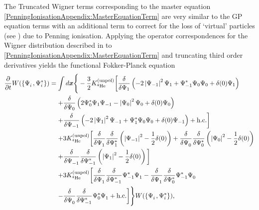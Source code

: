 The Truncated Wigner terms corresponding to the master equation \eqref{PenningIonisationAppendix:MasterEquationTerm} are very similar to the GP equation terms with an additional term to correct for the loss of `virtual' particles (see ) due to Penning ionisation.  Applying the operator correspondences for the Wigner distribution described in  to \eqref{PenningIonisationAppendix:MasterEquationTerm} and truncating third order derivatives yields the functional Fokker-Planck equation
\begin{align}
    \begin{split}
    \frac{\partial}{\partial t} W(\left\{ \Psi_i^{\phantom{*}}, \Psi_i^*\right\}) &= \int d \vect{x} \Bigg\{ -\frac{3}{2}\Kunpol\bigg[\frac{\delta}{\delta \Psi_1}\left(-2 \abs{\Psi_{-1}}^2\Psi_1 +\Psi_{-1}^*\Psi_0\Psi_0  + \delta(0) \Psi_1\right)\\
    &\relphantom{=} +\frac{\delta}{\delta \Psi_0}\left(2 \Psi_0^* \Psi_1 \Psi_{-1}  - \abs{\Psi_0}^2 \Psi_0 + \delta(0) \Psi_0\right)\\
    &\relphantom{=} +\frac{\delta}{\delta \Psi_{-1}}\left(- 2 \abs{\Psi_1}^2 \Psi_{-1} + \Psi_1^* \Psi_0 \Psi_0  + \delta(0) \Psi_{-1}\right) + \text{h.c.} \bigg]\\
    &\relphantom{=} + 3 \Kunpol \bigg[\frac{\delta}{\delta \Psi_1^{\phantom{*}}} \frac{\delta}{\delta \Psi_1^*}\left(\abs{\Psi_{-1}}^2 - \frac{1}{2} \delta(0)\right) + \frac{\delta}{\delta \Psi_0^{\phantom{*}}} \frac{\delta}{\delta \Psi_0^*}\left(\abs{\Psi_0}^2 - \frac{1}{2} \delta(0)\right) \\
    &\relphantom{=} + \frac{\delta}{\delta \Psi_{-1}^{\phantom{*}}} \frac{\delta}{\delta \Psi_{-1}^*} \left(\abs{\Psi_1}^2 - \frac{1}{2}\delta(0)\right)\bigg] \\
    &\relphantom{=} +3 \Kunpol\bigg[\frac{\delta}{\delta \Psi_1^{\phantom{*}}}\frac{\delta}{\delta \Psi_{-1}^*}\Psi_{-1}^*\Psi_{1}^{\phantom{*}}  - \frac{\delta}{\delta \Psi_{1}^{\phantom{*}}}\frac{\delta}{\delta \Psi_0^*}\Psi_{-1}^* \Psi_0^{\phantom{*}} \\
    &\relphantom{=} - \frac{\delta}{\delta \Psi_0^{\phantom{*}}}\frac{\delta}{\delta \Psi_{-1}^*} \Psi_0^* \Psi_1^{\phantom{*}} + \text{h.c.} \bigg]\Bigg\}W(\left\{\Psi_i^{\phantom{*}}, \Psi_i^* \right\}),
    \end{split}
    \label{PenningIonisationAppendix:FunctionalFokkerPlanckEquation}
\end{align}

